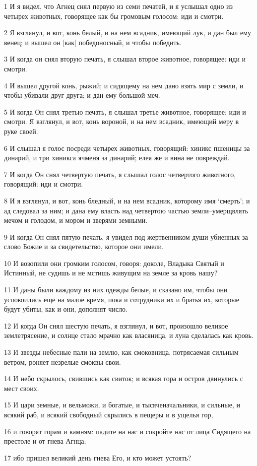 \par 1 И я видел, что Агнец снял первую из семи печатей, и я услышал одно из четырех животных, говорящее как бы громовым голосом: иди и смотри.
\par 2 Я взглянул, и вот, конь белый, и на нем всадник, имеющий лук, и дан был ему венец; и вышел он [как] победоносный, и чтобы победить.
\par 3 И когда он снял вторую печать, я слышал второе животное, говорящее: иди и смотри.
\par 4 И вышел другой конь, рыжий; и сидящему на нем дано взять мир с земли, и чтобы убивали друг друга; и дан ему большой меч.
\par 5 И когда Он снял третью печать, я слышал третье животное, говорящее: иди и смотри. Я взглянул, и вот, конь вороной, и на нем всадник, имеющий меру в руке своей.
\par 6 И слышал я голос посреди четырех животных, говорящий: хиникс пшеницы за динарий, и три хиникса ячменя за динарий; елея же и вина не повреждай.
\par 7 И когда Он снял четвертую печать, я слышал голос четвертого животного, говорящий: иди и смотри.
\par 8 И я взглянул, и вот, конь бледный, и на нем всадник, которому имя `смерть'; и ад следовал за ним; и дана ему власть над четвертою частью земли--умерщвлять мечом и голодом, и мором и зверями земными.
\par 9 И когда Он снял пятую печать, я увидел под жертвенником души убиенных за слово Божие и за свидетельство, которое они имели.
\par 10 И возопили они громким голосом, говоря: доколе, Владыка Святый и Истинный, не судишь и не мстишь живущим на земле за кровь нашу?
\par 11 И даны были каждому из них одежды белые, и сказано им, чтобы они успокоились еще на малое время, пока и сотрудники их и братья их, которые будут убиты, как и они, дополнят число.
\par 12 И когда Он снял шестую печать, я взглянул, и вот, произошло великое землетрясение, и солнце стало мрачно как власяница, и луна сделалась как кровь.
\par 13 И звезды небесные пали на землю, как смоковница, потрясаемая сильным ветром, роняет незрелые смоквы свои.
\par 14 И небо скрылось, свившись как свиток; и всякая гора и остров двинулись с мест своих.
\par 15 И цари земные, и вельможи, и богатые, и тысяченачальники, и сильные, и всякий раб, и всякий свободный скрылись в пещеры и в ущелья гор,
\par 16 и говорят горам и камням: падите на нас и сокройте нас от лица Сидящего на престоле и от гнева Агнца;
\par 17 ибо пришел великий день гнева Его, и кто может устоять?

